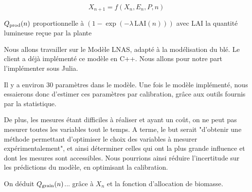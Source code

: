 \begin{equation}
  X_{n+1} = f(X_n,E_n,P,n)
\end{equation} 

$Q_{\text{prod}}(n)$ proportionnelle à $(1-\exp{(-\lambda \, \text{LAI}(n))})$ 
avec LAI la quantité lumineuse reçue par la plante

Nous allons travailler sur le Modèle LNAS, adapté à la modélisation du blé. 
Le client a déjà implémenté ce modèle en C++. 
Nous allons pour notre part l'implémenter sous Julia.

Il y a environ 30 paramètres dans le modèle. Une fois le modèle implémenté, nous essaierons donc d'estimer ces paramètres par calibration, grâce aux outils fournis par la statistique.

De plus, les mesures étant difficiles à réaliser et ayant un coût, on ne peut pas mesurer toutes les variables tout le temps. A terme, le but serait "d'obtenir une méthode permettant d'optimiser le choix des variables à mesurer expérimentalement", et ainsi déterminer celles qui ont la plus grande influence et dont les mesures sont accessibles. Nous pourrions ainsi réduire l'incertitude sur les prédictions du modèle, en optimisant la calibration.

On déduit $Q_{\text{grain}}(n)$... grâce à $X_n$ et la fonction d'allocation de biomasse.


